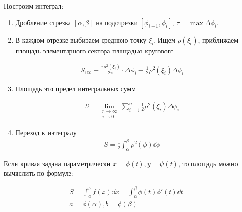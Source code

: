 
\begin{minipage}{\linewidth}
  \begin{multicols*}{2}
  
  \columnbreak

  Построим интеграл:
  \begin{enumerate}
    \item Дробление отрезка \([\alpha, \beta]\) на подотрезки
      \([\phi_{i - 1}, \phi_{i}]\), \(\tau = \max \Delta \phi_{i}\).

    \item В каждом отрезке выбираем среднюю точку \(\xi_{i}\). Ищем
      \(\rho(\xi_{i})\), приближаем площадь элементарного сектора площадью
      кругового.
    
      \begin{align*}
        S_{sec}
        = \frac{\pi \rho^2(\xi_{i})}{2 \pi} \cdot \Delta \phi_{i}
        = \frac{1}{2} \rho^2(\xi_{i}) \Delta \phi_{i}
      \end{align*}

    \item Площадь это предел интегральных сумм
    
    \begin{align*}
      S = \lim_{\substack{n \to \infty \\ \tau \to 0}}
        \sum_{i = 1}^{n} \frac{1}{2} \rho^2(\xi_{i}) \Delta \phi_{i}
    \end{align*}
    
    \item Переход к интегралу
    \begin{align*}
      S = \frac{1}{2} \int_{\alpha}^{\beta} \rho^2(\phi) \dd \phi
    \end{align*}
  \end{enumerate}

  \end{multicols*}
\end{minipage}

\begin{remark}
  Если кривая задана параметрически \(x = \phi(t), y = \psi(t)\), то площадь
  можно вычислить по формуле:

  \begin{align*}
    S
    = \int_{a}^{b} f(x) \dd x
    = \int_{\alpha}^{\beta} \phi(t) \phi'(t) \dd t \\
    a = \phi(\alpha), b = \phi(\beta)
  \end{align*}
\end{remark}